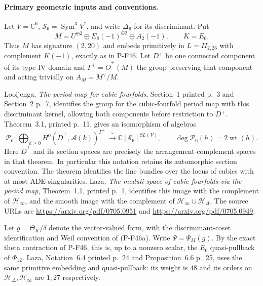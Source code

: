\documentclass[11pt,a4paper]{article}
\begin{document}
\paragraph{Primary geometric inputs and conventions.}
Let $V=\mathbb C^6$, $\mathscr S_6=\operatorname{Sym}^3V^*$,
and write $\Delta_6$ for its discriminant. Put
\[
 M=U^{\oplus2}\oplus E_8(-1)^{\oplus2}\oplus A_2(-1),
 \qquad K=E_6.
\]
Thus $M$ has signature $(2,20)$ and embeds primitively in
$L=II_{2,26}$ with complement $K(-1)$, exactly as in P-F46.
Let $D^+$ be one connected component of its type-IV domain and
$\Gamma^+=\widetilde O^+(M)$ the group preserving that component
and acting trivially on $A_M=M^\vee/M$.

Looijenga, \emph{The period map for cubic fourfolds}, Section~1
printed p.~3 and Section~2 p.~7, identifies the group for the
cubic-fourfold period map with this discriminant kernel, allowing
both components before restriction to $D^+$. Theorem~3.1,
printed p.~11, gives an isomorphism of algebras
\[
 \mathcal P_6:\bigoplus_{k\ge0}
 H^0(\dot D^+,\mathcal A(k))^{\Gamma^+}
       \ \xrightarrow{\ \sim\ }
 \mathbb C[\mathscr S_6]^{SL(V)},
 \qquad \deg\mathcal P_6(h)=2\operatorname{wt}(h).
 \tag{P-F55a}
\]
Here $\dot D^+$ and its section spaces are precisely the
arrangement-complement spaces in that theorem. In particular this
notation retains its automorphic section convention. The theorem
identifies the line bundles over the locus of cubics with at most
ADE singularities. Laza, \emph{The moduli space of cubic fourfolds
via the period map}, Theorem~1.1, printed p.~1, identifies this
image with the complement of $\mathcal H_\infty$, and the smooth
image with the complement of
$\mathcal H_\infty\cup\mathcal H_\Delta$.
The source URLs are
\url{https://arxiv.org/pdf/0705.0951} and
\url{https://arxiv.org/pdf/0705.0949}.

Let $g=\Theta_K/\delta$ denote the vector-valued form, with the
discriminant-coset identification and Weil convention of (P-F46a).
Write $\Psi=\Psi_M(g)$. By the exact theta contraction of P-F46,
this is, up to a nonzero scalar, the $E_6$ quasi-pullback of
$\Phi_{12}$. Laza, Notation~6.4 printed p.~24 and
Proposition~6.6 p.~25, uses the same primitive embedding and
quasi-pullback: its weight is $48$ and its orders on
$\mathcal H_\Delta,\mathcal H_\infty$ are $1,27$ respectively.
\end{document}
